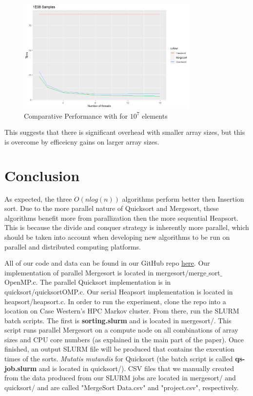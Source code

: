 \documentclass[conference]{IEEEtran}
\begin{document}
    \begin{figure}
        \includegraphics[width=9cm]{1e8.png} 
        \caption{Comparative Performance with for $10^7$ elements}
        \label{1e8}
    \end{figure}
    
    This suggests that there is significant overhead with smaller array sizes, but this is overcome by efficeicny gains on larger array sizes. 
    \section{Conclusion}
    As expected, the three $O(n log(n))$ algorithms perform better then Insertion sort. 
    Due to the more parallel nature of Quicksort and Mergesort, these algorithms benefit more from parallization then the more sequential Heapsort. 
    This is because the divide and conquer strategy is inherently more parallel, which should be taken into account when developing new algorithms to be run on parallel and distributed computing platforms. 
    
    
    \appendix
	All of our code and data can be found in our GitHub repo \href{https://github.com/causeyc/csds438_sorting}{here}. Our implementation of parallel Mergesort is located in mergesort/merge$\_$sort$\_$OpenMP.c. The parallel Quicksort implementation is in quicksort/quicksortOMP.c. Our serial Heapsort implementation is located in heapsort/heapsort.c. In order to run the experiment, clone the repo into a location on Case Western's HPC Markov cluster. From there, run the SLURM batch scripts. The first is \textbf{sorting.slurm} and is located in mergesort/. This script runs parallel Mergesort on a compute node on all combinations of array sizes and CPU core numbers (as explained in the main part of the paper). Once finished, an output SLURM file will be produced that contains the execution times of the sorts. \textit{Mutatis mutandis} for Quicksort (the batch script is called \textbf{qs-job.slurm} and is located in quicksort/). CSV files that we manually created from the data produced from our SLURM jobs are located in mergesort/ and quicksort/ and are called "MergeSort Data.csv" and "project.csv", respectively.
\end{document}
